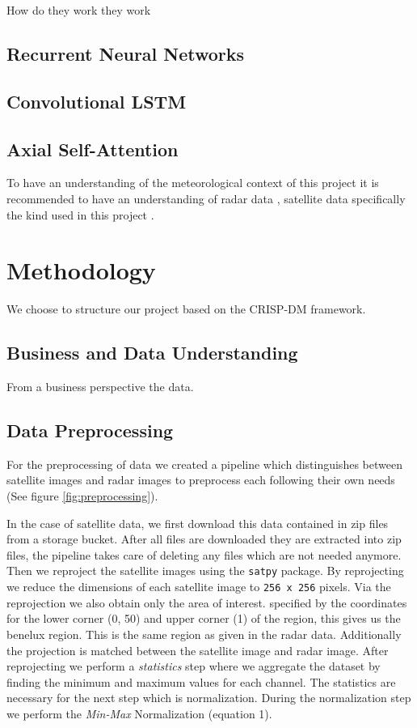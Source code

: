 \documentclass[acmtog, authorversion]{acmart}
\begin{document}
How do they work
they work

\subsection{Recurrent Neural Networks}

\subsection{Convolutional LSTM}

\subsection{Axial Self-Attention}
To have an understanding of the meteorological context of this project it is recommended to have an understanding of radar data \cite{rinehart1991radar}, satellite data specifically the kind used in this project \cite{schmid-no-date}.

\section{Methodology}
We choose to structure our project based on the CRISP-DM framework.

\subsection{Business and Data Understanding}
From a business perspective the data.

\subsection{Data Preprocessing}

For the preprocessing of data we created a pipeline which distinguishes between satellite images and radar images to preprocess each following their own needs (See figure \ref{fig:preprocessing}).

In the case of satellite data, we first download this data contained in zip files from a storage bucket. After all files are downloaded they are extracted into zip files, the pipeline takes care of deleting any files which are not needed anymore.
Then we reproject the satellite images using the \texttt{satpy} package. By reprojecting we reduce the dimensions of each satellite image to \texttt{256 x 256} pixels.
Via the reprojection we also obtain only the area of interest. specified by the coordinates for the lower corner (0, 50) and upper corner (1) of the region, this gives us the benelux region. This is the same region as given in the radar data.
Additionally the projection is matched between the satellite image and radar image.
After reprojecting we perform a \textit{statistics} step where we aggregate the dataset by finding the minimum and maximum values for each channel.
The statistics are necessary for the next step which is normalization. During the normalization step we perform the \textit{Min-Max} Normalization (equation 1).
\end{document}
